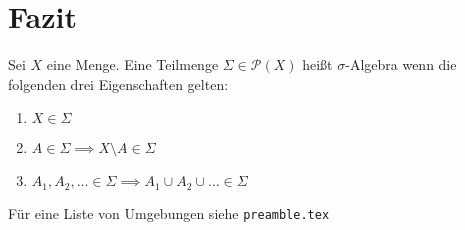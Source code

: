 \chapter{Fazit}
\label{ch:conclusion}

\Blindtext

\begin{definition}
    Sei $X$ eine Menge. Eine Teilmenge $\Sigma \in \mathcal{P}\left(X\right)$ heißt
    $\sigma$-Algebra wenn die folgenden drei Eigenschaften gelten: 
    \begin{enumerate}
        \item $X \in \Sigma$
        \item $A \in \Sigma \implies X \setminus A \in \Sigma$
        \item $A_1,A_2,\dots \in \Sigma \implies A_1 \cup A_2 \cup \dots \in \Sigma$
    \end{enumerate}
\end{definition}
Für eine Liste von Umgebungen siehe \texttt{preamble.tex}


